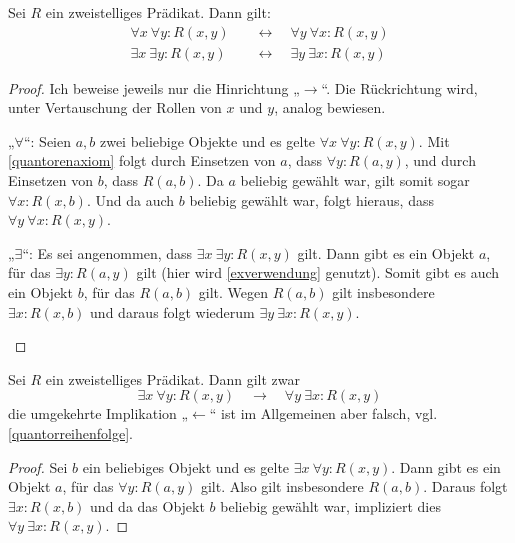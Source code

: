 \begin{satz} \label{quantorentausch}
    Sei $R$ ein zweistelliges Prädikat. Dann gilt:
    \begin{align*}
        \forall x\ \forall y: R(x,y) \quad &\leftrightarrow\quad \forall y\ \forall x: R(x,y) \\
        \exists x\ \exists y: R(x,y) \quad &\leftrightarrow\quad  \exists y\ \exists x: R(x,y)
    \end{align*}
\end{satz}
\begin{proof}
    Ich beweise jeweils nur die Hinrichtung „$\to$“. Die Rückrichtung wird, unter Vertauschung der Rollen von $x$ und $y$, analog bewiesen.
    \begin{labeling}
        \item[„$\forall$“:] Seien $a,b$ zwei beliebige Objekte und es gelte $\forall x\ \forall y: R(x,y)$. Mit \cref{quantorenaxiom} folgt durch Einsetzen von $a$, dass $\forall y: R(a,y)$, und durch Einsetzen von $b$, dass $R(a,b)$. Da $a$ beliebig gewählt war, gilt somit sogar $\forall x: R(x,b)$. Und da auch $b$ beliebig gewählt war, folgt hieraus, dass $\forall y\ \forall x: R(x,y)$.
        \item[„$\exists$“:] Es sei angenommen, dass $\exists x\ \exists y: R(x,y)$ gilt. Dann gibt es ein Objekt $a$, für das $\exists y: R(a,y)$ gilt (hier wird \cref{exverwendung} genutzt). Somit gibt es auch ein Objekt $b$, für das $R(a,b)$ gilt. Wegen $R(a,b)$ gilt insbesondere $\exists x: R(x,b)$ und daraus folgt wiederum $\exists y\ \exists x: R(x,y)$. \qedhere
    \end{labeling}
\end{proof}


\begin{satz}
    Sei $R$ ein zweistelliges Prädikat. Dann gilt zwar
        \[ \exists x\ \forall y: R(x,y) \quad\to\quad \forall y\ \exists x: R(x,y) \]  
    die umgekehrte Implikation „$\leftarrow$“ ist im Allgemeinen aber falsch, vgl. \cref{quantorreihenfolge}.
\end{satz}
\begin{proof}
    Sei $b$ ein beliebiges Objekt und es gelte $\exists x\ \forall y: R(x,y)$. Dann gibt es ein Objekt $a$, für das $\forall y: R(a,y)$ gilt. Also gilt insbesondere $R(a,b)$. Daraus folgt $\exists x: R(x,b)$ und da das Objekt $b$ beliebig gewählt war, impliziert dies $\forall y\ \exists x: R(x,y)$.
\end{proof}




